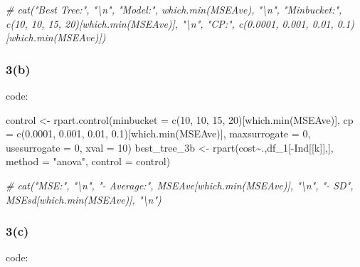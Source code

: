 \documentclass[
]{article}
\newenvironment{Shaded}{\begin{snugshade}}{\end{snugshade}}
\newcommand{\AttributeTok}[1]{\textcolor[rgb]{0.77,0.63,0.00}{#1}}
\newcommand{\CommentTok}[1]{\textcolor[rgb]{0.56,0.35,0.01}{\textit{#1}}}
\newcommand{\DecValTok}[1]{\textcolor[rgb]{0.00,0.00,0.81}{#1}}
\newcommand{\FloatTok}[1]{\textcolor[rgb]{0.00,0.00,0.81}{#1}}
\newcommand{\FunctionTok}[1]{\textcolor[rgb]{0.00,0.00,0.00}{#1}}
\newcommand{\NormalTok}[1]{#1}
\newcommand{\OtherTok}[1]{\textcolor[rgb]{0.56,0.35,0.01}{#1}}
\newcommand{\SpecialCharTok}[1]{\textcolor[rgb]{0.00,0.00,0.00}{#1}}
\newcommand{\StringTok}[1]{\textcolor[rgb]{0.31,0.60,0.02}{#1}}
\begin{document}
\begin{Shaded}
\begin{Highlighting}[]
\CommentTok{\# cat("Best Tree:", "\textbackslash{}n", "Model:", which.min(MSEAve), "\textbackslash{}n", "Minbucket:", c(10, 10, 15, 20)[which.min(MSEAve)], "\textbackslash{}n", "CP:", c(0.0001, 0.001, 0.01, 0.1)[which.min(MSEAve)])}
\end{Highlighting}
\end{Shaded}

\hypertarget{b-6}{%
\subsubsection{3(b)}\label{b-6}}

code:

\begin{Shaded}
\begin{Highlighting}[]
\NormalTok{control }\OtherTok{\textless{}{-}} \FunctionTok{rpart.control}\NormalTok{(}\AttributeTok{minbucket =} \FunctionTok{c}\NormalTok{(}\DecValTok{10}\NormalTok{, }\DecValTok{10}\NormalTok{, }\DecValTok{15}\NormalTok{, }\DecValTok{20}\NormalTok{)[}\FunctionTok{which.min}\NormalTok{(MSEAve)], }\AttributeTok{cp =} \FunctionTok{c}\NormalTok{(}\FloatTok{0.0001}\NormalTok{, }\FloatTok{0.001}\NormalTok{, }\FloatTok{0.01}\NormalTok{, }\FloatTok{0.1}\NormalTok{)[}\FunctionTok{which.min}\NormalTok{(MSEAve)], }\AttributeTok{maxsurrogate =} \DecValTok{0}\NormalTok{, }\AttributeTok{usesurrogate =} \DecValTok{0}\NormalTok{, }\AttributeTok{xval =} \DecValTok{10}\NormalTok{)}
\NormalTok{best\_tree\_3b }\OtherTok{\textless{}{-}} \FunctionTok{rpart}\NormalTok{(cost}\SpecialCharTok{\textasciitilde{}}\NormalTok{.,df\_1[}\SpecialCharTok{{-}}\NormalTok{Ind[[k]],], }\AttributeTok{method =} \StringTok{"anova"}\NormalTok{, }\AttributeTok{control =}\NormalTok{ control)}

\CommentTok{\# cat("MSE:", "\textbackslash{}n", "{-} Average:", MSEAve[which.min(MSEAve)], "\textbackslash{}n", "{-} SD", MSEsd[which.min(MSEAve)], "\textbackslash{}n")}
\end{Highlighting}
\end{Shaded}

\hypertarget{c-6}{%
\subsubsection{3(c)}\label{c-6}}

code:
\end{document}
